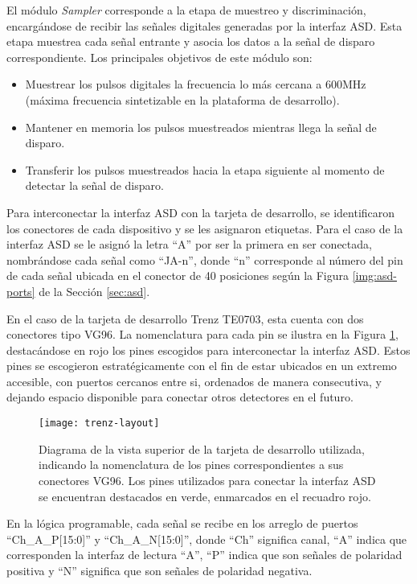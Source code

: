 	El módulo \textit{Sampler} corresponde a la etapa de muestreo y discriminación, encargándose de recibir las señales digitales generadas por la interfaz ASD. Esta etapa muestrea cada señal entrante y asocia los datos a la señal de disparo correspondiente. Los principales objetivos de este módulo son:
	
	\begin{itemize}
		\item Muestrear los pulsos digitales la frecuencia lo más cercana a 600MHz (máxima frecuencia sintetizable en la plataforma de desarrollo).
		\item Mantener en memoria los pulsos muestreados mientras llega la señal de disparo.
		\item Transferir los pulsos muestreados hacia la etapa siguiente al momento de detectar la señal de disparo.
	\end{itemize}

	Para interconectar la interfaz ASD con la tarjeta de desarrollo, se identificaron los conectores de cada dispositivo y se les asignaron etiquetas. Para el caso de la interfaz ASD se le asignó la letra ``A'' por ser la primera en ser conectada, nombrándose cada señal como ``JA-n'', donde ``n'' corresponde al número del pin de cada señal ubicada en el conector de 40 posiciones según la Figura \ref{img:asd-ports} de la Sección \ref{sec:asd}.
	
	En el caso de la tarjeta de desarrollo Trenz TE0703, esta cuenta con dos conectores tipo VG96. La nomenclatura para cada pin se ilustra en la Figura \ref{fig:trenz-layout}, destacándose en rojo los pines escogidos para interconectar la interfaz ASD. Estos pines se escogieron estratégicamente con el fin de estar ubicados en un extremo accesible, con puertos cercanos entre si, ordenados de manera consecutiva, y dejando espacio disponible para conectar otros detectores en el futuro.
	
	\begin{figure}[H]
		\centering
		\texttt{[image: trenz-layout]}
		\caption{Diagrama de la vista superior de la tarjeta de desarrollo utilizada, indicando la nomenclatura de los pines correspondientes a sus conectores VG96. Los pines utilizados para conectar la interfaz ASD se encuentran destacados en verde, enmarcados en el recuadro rojo.}
		\label{fig:trenz-layout}
	\end{figure}
	
	En la lógica programable, cada señal se recibe en los arreglo de puertos ``Ch\_A\_P[15:0]'' y ``Ch\_A\_N[15:0]'', donde ``Ch'' significa canal, ``A'' indica que corresponden la interfaz de lectura ``A'', ``P'' indica que son señales de polaridad positiva y ``N'' significa que son señales de polaridad negativa.
	
